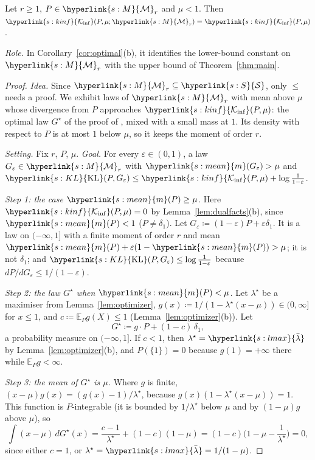 \documentclass[11pt]{article}
\newcommand{\E}{\mathbb{E}}
\newcommand{\sy}[2]{{\hyperlink{#1}{#2}}}
\newcommand{\Sm}{\sy{s:S}{\mathcal{S}}}
\newcommand{\Mm}{\sy{s:M}{\mathcal{M}}}
\newcommand{\mean}{\sy{s:mean}{m}}
\newcommand{\KL}{\sy{s:KL}{\mathrm{KL}}}
\newcommand{\Kinf}{\sy{s:kinf}{\mathcal{K}_{\inf}}}
\newcommand{\lmax}{\sy{s:lmax}{\bar{\lambda}}}
\begin{document}
\begin{lemma}\label{lem:class}
Let $r\ge1$, $P\in\Mm_r$ and $\mu<1$. Then $\Kinf(P,\mu;\Mm_r)=\Kinf(P,\mu)$.
\end{lemma}

\emph{Role.} In Corollary~\ref{cor:optimal}(b), it identifies the lower-bound constant on $\Mm_r$
with the upper bound of Theorem~\ref{thm:main}.

\begin{proof}
\emph{Idea.} Since $\Mm_r\subseteq\Sm$, only $\le$ needs a proof. We exhibit laws of $\Mm_r$ with
mean above $\mu$ whose divergence from $P$ approaches $\Kinf(P,\mu)$: the optimal law $G^\star$ of
the proof of \citet[Theorem~2]{HT15}, mixed with a small mass at $1$. Its density with respect to
$P$ is at most $1$ below $\mu$, so it keeps the moment of order $r$.

\emph{Setting.} Fix $r$, $P$, $\mu$. \emph{Goal.} For every $\varepsilon\in(0,1)$, a law
$G_\varepsilon\in\Mm_r$ with $\mean(G_\varepsilon)>\mu$ and
$\KL(P,G_\varepsilon)\le\Kinf(P,\mu)+\log\frac1{1-\varepsilon}$.

\emph{Step 1: the case $\mean(P)\ge\mu$.} Here $\Kinf(P,\mu)=0$ by Lemma~\ref{lem:dualfacts}(b), since
$\mean(P)<1$ ($P\ne\delta_1$). Let $G_\varepsilon\coloneqq(1-\varepsilon)P+\varepsilon\delta_1$. It is
a law on $(-\infty,1]$ with a finite moment of order $r$ and mean
$\mean(P)+\varepsilon(1-\mean(P))>\mu$; it is not $\delta_1$; and $\KL(P,G_\varepsilon)\le\log\frac1{1-\varepsilon}$
because $dP/dG_\varepsilon\le1/(1-\varepsilon)$.

\emph{Step 2: the law $G^\star$ when $\mean(P)<\mu$.} Let $\lambda^\star$ be a maximiser from
Lemma~\ref{lem:optimizer}, $g(x)\coloneqq1/(1-\lambda^\star(x-\mu))\in(0,\infty]$ for $x\le1$, and
$c\coloneqq\E_Pg(X)\le1$ (Lemma~\ref{lem:optimizer}(b)). Let
\[
  G^\star\coloneqq g\cdot P+(1-c)\,\delta_1,
\]
a probability measure on $(-\infty,1]$. If $c<1$, then $\lambda^\star=\lmax$ by
Lemma~\ref{lem:optimizer}(b), and $P(\{1\})=0$ because $g(1)=+\infty$ there while $\E_Pg<\infty$.

\emph{Step 3: the mean of $G^\star$ is $\mu$.} Where $g$ is finite,
$(x-\mu)g(x)=(g(x)-1)/\lambda^\star$, because $g(x)(1-\lambda^\star(x-\mu))=1$. This function is
$P$-integrable (it is bounded by $1/\lambda^\star$ below $\mu$ and by $(1-\mu)g$ above $\mu$), so
\[
  \int(x-\mu)\,dG^\star(x)=\frac{c-1}{\lambda^\star}+(1-c)(1-\mu)=(1-c)\Big(1-\mu-\frac1{\lambda^\star}\Big)=0,
\]
since either $c=1$, or $\lambda^\star=\lmax=1/(1-\mu)$.


\end{proof}
\end{document}
